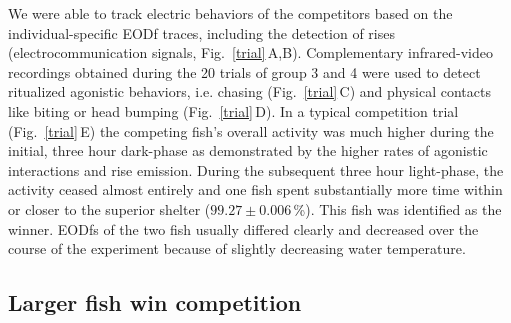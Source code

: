 \documentclass[vruler,JEB]{COB}%
\newcommand{\lepto}{\textit{A. leptorhynchus}}
\newcommand{\figitem}[1]{\textsf{\bfseries\uppercase{#1}}\penalty10000 }
\newcommand{\panel}[1]{\textsf{#1}}
\newcommand{\subfref}[2]{\textup{\ref{#1}}\,\panel{#2}}
\newcommand{\Figb}{Fig.}
\newcommand{\Subfigrefb}[2]{\Figb~\subfref{#1}{#2}}
\begin{document}

We were able to track electric behaviors of the competitors based on the individual-specific EODf traces, including the detection of rises (electrocommunication signals, \Subfigrefb{trial}{A,B}). Complementary infrared-video recordings obtained during the 20 trials of group 3 and 4 were used to detect ritualized agonistic behaviors, i.e. chasing (\Subfigrefb{trial}{C}) and physical contacts like biting or head bumping (\Subfigrefb{trial}{D}). In a typical competition trial (\Subfigrefb{trial}{E}) the competing fish's overall activity was much higher during the initial, three hour dark-phase as demonstrated by the higher rates of agonistic interactions and rise emission. During the subsequent three hour light-phase, the activity ceased almost entirely and one fish spent substantially more time within or closer to the superior shelter ($99.27 \pm 0.006$\,\%). This fish was identified as the winner. EODfs of the two fish usually differed clearly and decreased over the course of the experiment because of slightly decreasing water temperature.

\subsection{Larger fish win competition}
\end{document}
